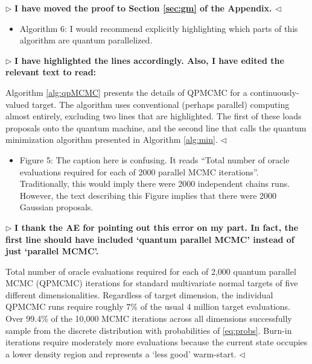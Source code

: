 \documentclass[12pt]{article}
\newenvironment{reply}{$\triangleright$\bfseries}{$\triangleleft$}
\renewenvironment{quote}
               {\list{}{\rightmargin\leftmargin}%
                \item\relax\normalfont}
               {\endlist}
\begin{document}
\begin{reply}
	I have moved the proof to Section \ref{sec:gm} of the Appendix.
\end{reply}

\begin{itemize}	
	
	\item Algorithm 6: I would recommend explicitly highlighting which parts of this algorithm are quantum parallelized.

\end{itemize}

\begin{reply}
	I have highlighted the lines accordingly.  Also, I have edited the relevant text to read:
	\begin{quote}
		Algorithm \ref{alg:qpMCMC} presents the details of QPMCMC for a continuously-valued target.  The algorithm uses conventional (perhaps parallel) computing almost entirely, excluding two lines that are highlighted.  The first of these loads proposals onto the quantum machine, and the second line that calls the quantum minimization algorithm presented in Algorithm \ref{alg:min}. 
	\end{quote}
\end{reply}

\begin{itemize}
	
	\item Figure 5: The caption here is confusing. It reads ``Total number of oracle evaluations required for each of 2000 parallel MCMC iterations''. Traditionally, this would imply there were 2000 independent chains runs. However, the text describing this Figure implies that there were 2000 Gaussian proposals.
	
\end{itemize}

\begin{reply}
	I thank the AE for pointing out this error on my part.  In fact, the first line should have included `quantum parallel MCMC' instead of just `parallel MCMC'.
	
	\begin{quote}
		Total number of oracle evaluations required for each of 2,000 quantum parallel MCMC (QPMCMC) iterations for standard multivariate normal targets of five different dimensionalities. Regardless of target dimension, the individual QPMCMC runs require roughly $7$\% of the usual 4 million target evaluations. Over  99.4\% of the 10,000 MCMC iterations across all dimensions successfully sample from the discrete distribution with probabilities of \eqref{eq:probs}. Burn-in iterations require moderately more evaluations because the current state occupies a lower density region and represents a `less good' warm-start.
	\end{quote}
\end{reply}
\end{document}
